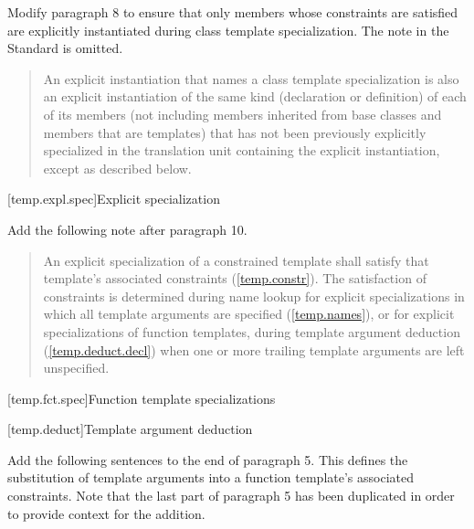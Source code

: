 Modify paragraph 8 to ensure that only members whose constraints are 
satisfied are explicitly instantiated during class template 
specialization. The note in the \Cpp Standard is omitted.

\begin{quote}
\setcounter{Paras}{7}
\pnum
An explicit instantiation that names a class template specialization is 
also an explicit instantiation of the same kind (declaration or 
definition) of each of its members (not including members inherited from 
base classes and members that are templates) that has not been previously 
explicitly specialized in the translation unit containing the explicit 
instantiation,  
except as described below.
\end{quote}

[temp.expl.spec]{Explicit specialization}

Add the following note after paragraph 10.

\begin{quote}
\setcounter{Paras}{10}
\begin{addedblock}
\pnum
\enternote
An explicit specialization of a constrained template shall satisfy that
template's associated constraints (\ref{temp.constr}). The satisfaction
of constraints is determined during name lookup for explicit specializations
in which all template arguments are specified (\ref{temp.names}), or for
explicit specializations of function templates, during template argument 
deduction (\ref{temp.deduct.decl}) when one or more trailing template 
arguments are left unspecified.
\exitnote
\end{addedblock}
\end{quote}


[temp.fct.spec]{Function template specializations}

\setcounter{subsection}{1}
[temp.deduct]{Template argument deduction}

Add the following sentences to the end of paragraph 5. This defines
the substitution of template arguments into a function template's
associated constraints. Note that the last part of paragraph 5
has been duplicated in order to provide context for the addition.

